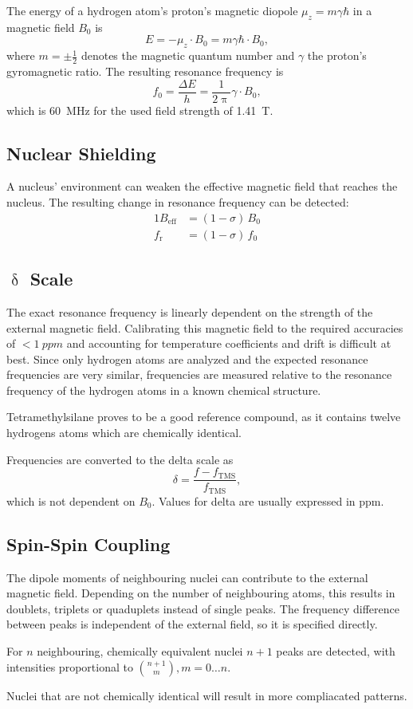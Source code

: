 The energy of a hydrogen atom's proton's magnetic diopole $\mu_z = m \gamma \hbar$ in a magnetic field $B_0$ is
\begin{equation*}
	E = - \mu_z \cdot B_0 = m \gamma \hbar \cdot B_0,
\end{equation*}
where $m = \pm \tfrac{1}{2}$ denotes the magnetic quantum number and $\gamma$ the proton's gyromagnetic ratio.
The resulting resonance frequency is
\begin{equation*}
	f_0 = \frac{\Delta E}{h} = \frac{1}{2 \uppi} \gamma \cdot B_0,
\end{equation*}
which is \SI{60}{\mega\hertz} for the used field strength of \SI{1.41}{\tesla}.

\subsection{Nuclear Shielding}
A nucleus' environment can weaken the effective magnetic field that reaches the nucleus.
The resulting change in resonance frequency can be detected:
\begin{alignat*}{1}
	B_\text{eff} &= \left(1 - \sigma \right) \, B_0\\
	f_\text{r} &= \left(1 - \sigma \right) \, f_0
\end{alignat*}

\subsection{$\updelta$ Scale}
The exact resonance frequency is linearly dependent on the strength of the external magnetic field.
Calibrating this magnetic field to the required accuracies of $< \SI{1}{ppm}$ and accounting for temperature coefficients and drift is difficult at best.
Since only hydrogen atoms are analyzed and the expected resonance frequencies are very similar, frequencies are measured relative to the resonance frequency of the hydrogen atoms in a known chemical structure.

Tetramethylsilane proves to be a good reference compound, as it contains twelve hydrogens atoms which are chemically identical.

Frequencies are converted to the delta scale as
\begin{equation*}
	\delta = \frac{f - f_\text{TMS}}{f_\text{TMS}},
\end{equation*}
which is not dependent on $B_0$.
Values for delta are usually expressed in \si{ppm}.

\subsection{Spin-Spin Coupling}
The dipole moments of neighbouring nuclei can contribute to the external magnetic field.
Depending on the number of neighbouring atoms, this results in doublets, triplets or quaduplets instead of single peaks.
The frequency difference between peaks is independent of the external field, so it is specified directly.

For $n$ neighbouring, chemically equivalent nuclei $n + 1$ peaks are detected, with intensities proportional to ${{n + 1}\choose{m}}, m = 0 \dots n$.

Nuclei that are not chemically identical will result in more compliacated patterns.
